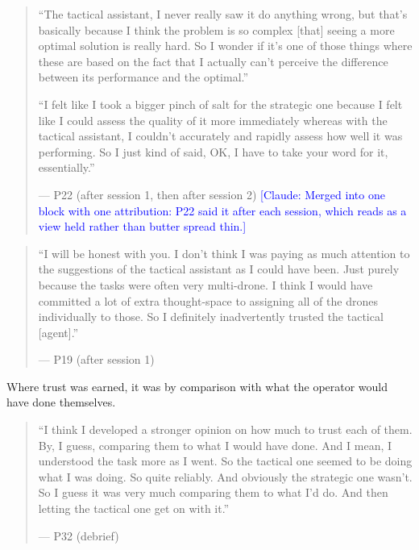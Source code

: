 \begin{quote}\small
``The tactical assistant, I never really saw it do anything wrong, but that's basically because I think the problem is so complex [that] seeing a more optimal solution is really hard. So I wonder if it's one of those things where these are based on the fact that I actually can't perceive the difference between its performance and the optimal.''\par\smallskip
``I felt like I took a bigger pinch of salt for the strategic one because I felt like I could assess the quality of it more immediately whereas with the tactical assistant, I couldn't accurately and rapidly assess how well it was performing. So I just kind of said, OK, I have to take your word for it, essentially.''\par\hfill--- P22 {\color{blue}(after session 1, then after session 2)}
\textcolor{blue}{[Claude: Merged into one block with one attribution: P22 said it after each session, which reads as a view held rather than butter spread thin.]}
\end{quote}

\begin{quote}\small
``I will be honest with you. I don't think I was paying as much attention to the suggestions of the tactical assistant as I could have been. Just purely because the tasks were often very multi-drone. I think I would have committed a lot of extra thought-space to assigning all of the drones individually to those. So I definitely inadvertently trusted the tactical [agent].''\par\hfill--- P19 (after session 1)
\end{quote}


\label{sec:qual:trust-unchecked:earned}
Where trust was earned, it was by comparison with what the operator would have done themselves.

\begin{quote}\small
``I think I developed a stronger opinion on how much to trust each of them. By, I guess, comparing them to what I would have done. And I mean, I understood the task more as I went. So the tactical one seemed to be doing what I was doing. So quite reliably. And obviously the strategic one wasn't. So I guess it was very much comparing them to what I'd do. And then letting the tactical one get on with it.''\par\hfill--- P32 (debrief)
\end{quote}

